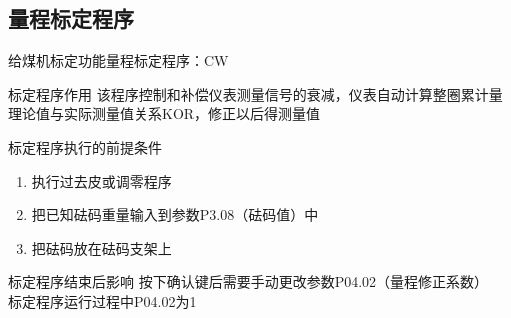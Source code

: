 \documentclass[12pt,hyperref={CJKbookmarks=true}]{beamer} %
\begin{document}
\subsection{量程标定程序}
\begin{frame}{给煤机标定功能}{量程标定程序：CW}
\begin{block}{标定程序作用}
  		该程序控制和补偿仪表测量信号的衰减，仪表自动计算整圈累计量理论值与实际测量值关系KOR，修正以后得测量值
\end{block}
\begin{exampleblock}{标定程序执行的前提条件}
  		\begin{enumerate}
				\item 执行过去皮或调零程序
				
				\item  把已知砝码重量输入到参数P3.08（砝码值）中
				
				\item   把砝码放在砝码支架上		
			\end{enumerate}
\end{exampleblock}
\begin{alertblock}{标定程序结束后影响}
  		按下确认键后需要手动更改参数P04.02（量程修正系数）\\
标定程序运行过程中P04.02为1
\end{alertblock}
	\end{frame}
\end{document}
